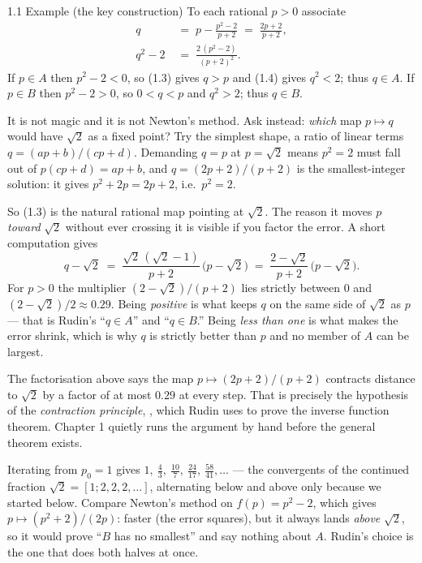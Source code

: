 \documentclass[11pt,twoside]{article}
\begin{document}
\begin{rudinbox}{\textsc{1.1} Example (the key construction)}
\upshape
To each rational $p>0$ associate
\begin{align}
  q &\;=\; p - \frac{p^2-2}{p+2} \;=\; \frac{2p+2}{p+2}, \tag{1.3}\\[2pt]
  q^2 - 2 &\;=\; \frac{2\,(p^2-2)}{(p+2)^2}. \tag{1.4}
\end{align}
If $p \in A$ then $p^2 - 2 < 0$, so (1.3) gives $q > p$ and (1.4) gives $q^2 < 2$;
thus $q \in A$. If $p \in B$ then $p^2 - 2 > 0$, so $0 < q < p$ and $q^2 > 2$;
thus $q \in B$.
\end{rudinbox}

\begin{unpack}
It is not magic and it is not Newton's method. Ask instead: \emph{which} map
$p \mapsto q$ would have $\sqrt2$ as a fixed point? Try the simplest shape, a
ratio of linear terms $q = (ap+b)/(cp+d)$. Demanding $q = p$ at $p = \sqrt 2$
means $p^2 = 2$ must fall out of $p(cp+d) = ap+b$, and $q = (2p+2)/(p+2)$ is the
smallest-integer solution: it gives $p^2 + 2p = 2p + 2$, i.e.\ $p^2 = 2$.

So (1.3) is the natural rational map pointing at $\sqrt 2$. The reason it moves
$p$ \emph{toward} $\sqrt2$ without ever crossing it is visible if you factor the
error. A short computation gives
\[
  q - \sqrt2 \;=\; \frac{\sqrt2\,(\sqrt2-1)}{p+2}\,\bigl(p - \sqrt2\bigr)
  \;=\; \frac{2-\sqrt2}{p+2}\,\bigl(p-\sqrt2\bigr).
\]
For $p > 0$ the multiplier $(2-\sqrt2)/(p+2)$ lies strictly between $0$ and
$(2-\sqrt2)/2 \approx 0.29$. Being \emph{positive} is what keeps $q$ on the same
side of $\sqrt2$ as $p$ --- that is Rudin's ``$q \in A$'' and ``$q \in B$.'' Being
\emph{less than one} is what makes the error shrink, which is why $q$ is strictly
better than $p$ and no member of $A$ can be largest.
\end{unpack}

\begin{deeper}
The factorisation above says the map $p \mapsto (2p+2)/(p+2)$ contracts distance
to $\sqrt2$ by a factor of at most $0.29$ at every step. That is precisely the
hypothesis of the \emph{contraction principle}, , which Rudin uses to
prove the inverse function theorem. Chapter 1 quietly runs the argument by hand
before the general theorem exists.

Iterating from $p_0 = 1$ gives $1,\ \tfrac43,\ \tfrac{10}{7},\ \tfrac{24}{17},\
\tfrac{58}{41}, \dots$ --- the convergents of the continued fraction
$\sqrt2 = [1;2,2,2,\dots]$, alternating below and above only because we started
below. Compare Newton's method on $f(p) = p^2-2$, which gives $p \mapsto
(p^2+2)/(2p)$: faster (the error squares), but it always lands \emph{above}
$\sqrt2$, so it would prove ``$B$ has no smallest'' and say nothing about $A$.
Rudin's choice is the one that does both halves at once.
\end{deeper}
\end{document}
